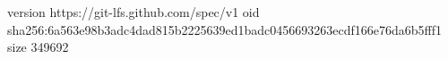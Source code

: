 version https://git-lfs.github.com/spec/v1
oid sha256:6a563e98b3adc4dad815b2225639ed1badc0456693263ecdf166e76da6b5fff1
size 349692
